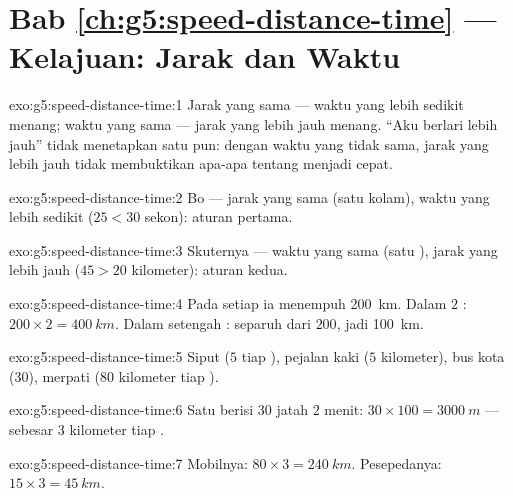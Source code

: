 \section*{Bab \ref{ch:g5:speed-distance-time} --- Kelajuan: Jarak dan Waktu}

\begin{solution}{exo:g5:speed-distance-time:1}
Jarak yang sama --- waktu yang lebih sedikit menang; waktu yang sama
--- jarak yang lebih jauh menang. ``Aku berlari lebih jauh'' tidak
menetapkan satu pun: dengan waktu yang tidak sama, jarak yang lebih
jauh tidak membuktikan apa-apa tentang menjadi cepat.
\end{solution}

\begin{solution}{exo:g5:speed-distance-time:2}
Bo --- jarak yang sama (satu kolam), waktu yang lebih sedikit
($25 < 30$ sekon): aturan pertama.
\end{solution}

\begin{solution}{exo:g5:speed-distance-time:3}
Skuternya --- waktu yang sama (satu ), jarak yang lebih jauh
($45 > 20$ kilometer): aturan kedua.
\end{solution}

\begin{solution}{exo:g5:speed-distance-time:4}
Pada setiap  ia menempuh \qty{200}{km}. Dalam $2$ : $200 \times 2
= \qty{400}{km}$. Dalam setengah : separuh dari $200$, jadi \qty{100}{km}.
\end{solution}

\begin{solution}{exo:g5:speed-distance-time:5}
Siput ($5$  tiap ), pejalan kaki ($5$ kilometer), bus kota
($30$), merpati ($80$ kilometer tiap ).
\end{solution}

\begin{solution}{exo:g5:speed-distance-time:6}
Satu  berisi $30$ jatah $2$ menit: $30 \times 100 =
\qty{3000}{m}$ ---  sebesar $3$ kilometer tiap .
\end{solution}

\begin{solution}{exo:g5:speed-distance-time:7}
Mobilnya: $80 \times 3 = \qty{240}{km}$. Pesepedanya: $15 \times 3 =
\qty{45}{km}$.
\end{solution}

